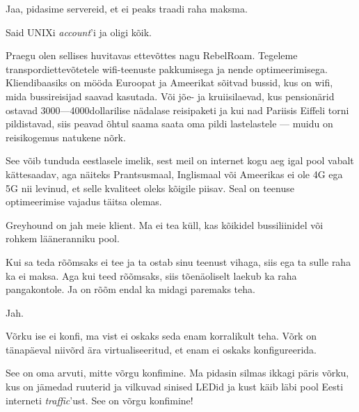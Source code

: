 
Jaa, pidasime servereid, et ei peaks traadi raha maksma.


Said UNIXi \emph{account}'i ja oligi kõik.


Praegu olen sellises huvitavas ettevõttes nagu RebelRoam. 
Tegeleme transpordiettevõtetele wifi-teenuste pakkumisega ja nende 
optimeerimisega. Kliendibaasiks on mööda Euroopat ja Ameerikat 
sõitvad bussid, kus on wifi, mida bussireisijad saavad kasutada. 
Või jõe- ja kruiisilaevad, kus pensionärid ostavad 3000---4000dollarilise nädalase reisipaketi ja kui nad Pariisis Eiffeli torni 
pildistavad, siis peavad õhtul saama saata oma pildi lastelastele --- muidu on 
reisikogemus natukene nõrk. 

See võib tunduda eestlasele imelik, sest meil on internet kogu aeg igal pool 
vabalt kättesaadav, aga näiteks Prantsusmaal, Inglismaal või Ameerikas ei 
ole 4G ega 5G nii levinud, et selle kvaliteet oleks kõigile piisav. Seal 
on teenuse optimeerimise vajadus täitsa olemas.


Greyhound on jah meie klient. Ma ei tea küll, kas kõikidel bussiliinidel või rohkem 
lääneranniku pool.


Kui sa teda rõõmsaks ei tee ja ta ostab sinu teenust vihaga, siis ega ta sulle raha
ka ei maksa. Aga kui teed rõõmsaks, siis tõenäoliselt laekub ka raha 
pangakontole. Ja on rõõm endal ka midagi paremaks teha.


Jah.


Võrku ise ei konfi, ma vist ei oskaks seda enam korralikult teha. Võrk on 
tänapäeval niivõrd ära virtualiseeritud, et enam ei oskaks konfigureerida.


See on oma arvuti, mitte võrgu konfimine. Ma pidasin silmas
ikkagi päris võrku, kus on jämedad ruuterid ja vilkuvad sinised LEDid ja kust käib 
läbi pool Eesti interneti \emph{traffic}'ust. See on võrgu 
konfimine! 